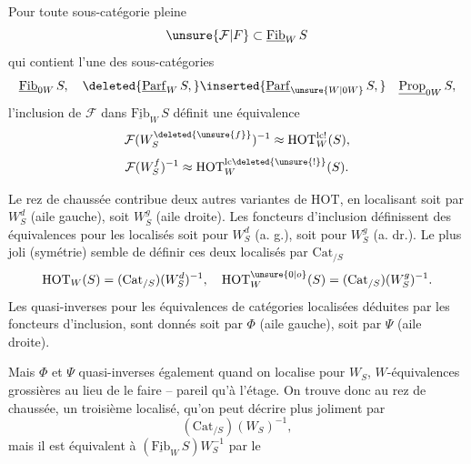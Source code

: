 Pour toute sous-catégorie pleine
\[
\unsure{\mathcal{F}|F}\subset\underline{\mathrm{Fib}}_W\,S
\]
qui contient l'une des  sous-catégories
\[
\underline{\mathrm{Fib}}_{0W}\,S,\quad \deleted{\underline{\mathrm{Parf}}_W\,S,}\inserted{\underline{\mathrm{Parf}}_{\unsure{W|0W}}\,S,}
\quad\underline{\mathrm{Prop}}_{0W}\,S,
\]
l'inclusion de $\mathcal{F}$ dans $\underline{\mathrm{Fib}}_W\,S$ définit une équivalence
\[
\mathcal{F}(W_S^{\deleted{\unsure{f}}})^{-1}\approx\mathrm{HOT}_W^{\mathrm{lc}!}(S),
\]
\[
\mathcal{F}(W_S^f)^{-1}\approx\mathrm{HOT}_W^{\mathrm{lc}\deleted{\unsure{!}}}(S).
\]

Le rez de chaussée contribue deux autres variantes
de $\mathrm{HOT}$, en localisant soit par $W_S^d$ (aile gauche),
soit  $W_S^g$ (aile droite). Les foncteurs d'inclusion
définissent des équivalences pour les localisés soit
pour $W_S^d$ (a. g.), soit pour $W_S^g$ (a. dr.). Le
plus joli (symétrie) semble de définir ces deux
localisés par $\mathrm{Cat}_{/S}$
\[
\mathrm{HOT}_W(S)=(\mathrm{Cat}_{/S})(W_S^d)^{-1},\quad
\mathrm{HOT}_W^{\unsure{0|o}}(S)=(\mathrm{Cat}_{/S})(W_S^g)^{-1}.
\]
Les quasi-inverses pour les équivalences de catégories
localisées déduites par les foncteurs d'inclusion,
sont donnés soit par $\Phi$ (aile gauche), soit par $\Psi$
(aile droite). 

Mais $\Phi$ et $\Psi$  quasi-inverses également quand on localise pour $W_S$,
 $W$-équivalences grossières au lieu de le faire
-- pareil qu'à l'étage. On trouve donc au rez
de chaussée, un  troisième localisé, qu'on peut
décrire  plus joliment par
\[
(\mathrm{Cat}_{/S})(W_S)^{-1},
\]
mais il est équivalent à $(\underline{\mathrm{Fib}}_W\,S)W_S^{-1}$ par le
